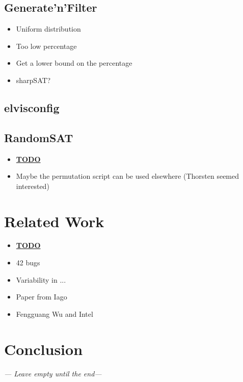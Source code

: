 \documentclass[a4paper,11pt]{report}
\begin{document}
\section{Generate'n'Filter}



\begin{itemize}
    \item Uniform distribution
    \item Too low percentage
    \item Get a lower bound on the percentage
    \item sharpSAT?
\end{itemize}

\section{elvisconfig}


\section{RandomSAT}


\begin{itemize}
    \item \underline{\textbf{TODO}}
    \item Maybe the permutation script can be used elsewhere (Thorsten seemed 
        interested)
\end{itemize}



\newpage
\chapter{Related Work}

\begin{itemize}
    \item \textbf{\underline{TODO}}
    \item 42 bugs
    \item Variability in ...
    \item Paper from Iago
    \item Fengguang Wu and Intel
\end{itemize}



\newpage
\chapter{Conclusion}
\emph{--- Leave empty until the end---}
\end{document}
